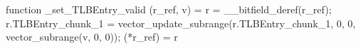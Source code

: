 function _set_TLBEntry_valid (r_ref, v) = {
    r = __bitfield_deref(r_ref);
    r.TLBEntry_chunk_1 = vector_update_subrange(r.TLBEntry_chunk_1, 0, 0, vector_subrange(v, 0, 0));
    (*r_ref) = r
}
